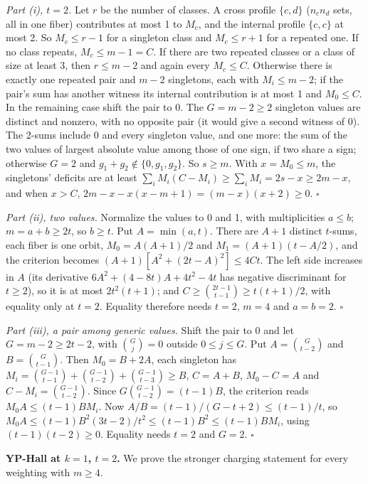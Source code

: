 \documentclass[11pt]{article}
\theoremstyle{plain}
\begin{document}
\emph{Part (i), $t = 2$.} Let $r$ be the number of classes. A cross profile $\{c, d\}$ ($n_c n_d$ sets, all in one fiber) contributes at most 1 to $M_c$, and the internal profile $\{c, c\}$ at most 2. So $M_c \le r - 1$ for a singleton class and $M_c \le r + 1$ for a repeated one. If no class repeats, $M_c \le m - 1 = C$. If there are two repeated classes or a class of size at least 3, then $r \le m - 2$ and again every $M_c \le C$. Otherwise there is exactly one repeated pair and $m - 2$ singletons, each with $M_i \le m - 2$; if the pair's sum has another witness its internal contribution is at most 1 and $M_0 \le C$. In the remaining case shift the pair to 0. The $G = m - 2 \ge 2$ singleton values are distinct and nonzero, with no opposite pair (it would give a second witness of 0). The 2-sums include $0$ and every singleton value, and one more: the sum of the two values of largest absolute value among those of one sign, if two share a sign; otherwise $G = 2$ and $g_1 + g_2 \notin \{0, g_1, g_2\}$. So $s \ge m$. With $x = M_0 \le m$, the singletons' deficits are at least $\sum_i M_i(C - M_i) \ge \sum_i M_i = 2s - x \ge 2m - x$, and when $x > C$,
$2m - x - x(x - m + 1) = (m - x)(x + 2) \ge 0$. $\square$

\emph{Part (ii), two values.} Normalize the values to 0 and 1, with multiplicities $a \le b$; $m = a + b \ge 2t$, so $b \ge t$. Put $A = \min(a, t)$. There are $A + 1$ distinct $t$-sums, each fiber is one orbit, $M_0 = A(A+1)/2$ and $M_1 = (A+1)(t - A/2)$, and the criterion becomes $(A+1)[A^2 + (2t - A)^2] \le 4Ct$. The left side increases in $A$ (its derivative $6A^2 + (4 - 8t)A + 4t^2 - 4t$ has negative discriminant for $t \ge 2$), so it is at most $2t^2(t+1)$; and $C \ge \binom{2t-1}{t-1} \ge t(t+1)/2$, with equality only at $t = 2$. Equality therefore needs $t = 2$, $m = 4$ and $a = b = 2$. $\square$

\emph{Part (iii), a pair among generic values.} Shift the pair to 0 and let $G = m - 2 \ge 2t - 2$, with $\binom{G}{j} = 0$ outside $0 \le j \le G$. Put $A = \binom{G}{t-2}$ and $B = \binom{G}{t-1}$. Then $M_0 = B + 2A$, each singleton has $M_i = \binom{G-1}{t-1} + \binom{G-1}{t-2} + \binom{G-1}{t-3} \ge B$, $C = A + B$, $M_0 - C = A$ and $C - M_i = \binom{G-1}{t-2}$. Since $G\binom{G-1}{t-2} = (t-1)B$, the criterion reads $M_0 A \le (t-1) B M_i$. Now $A/B = (t-1)/(G - t + 2) \le (t-1)/t$, so $M_0 A \le (t-1)B^2(3t-2)/t^2 \le (t-1)B^2 \le (t-1)BM_i$, using $(t-1)(t-2) \ge 0$. Equality needs $t = 2$ and $G = 2$. $\square$

\textbf{YP-Hall at $k=1$, $t=2$.}
We prove the stronger charging statement for every weighting with $m\ge4$.
\end{document}
